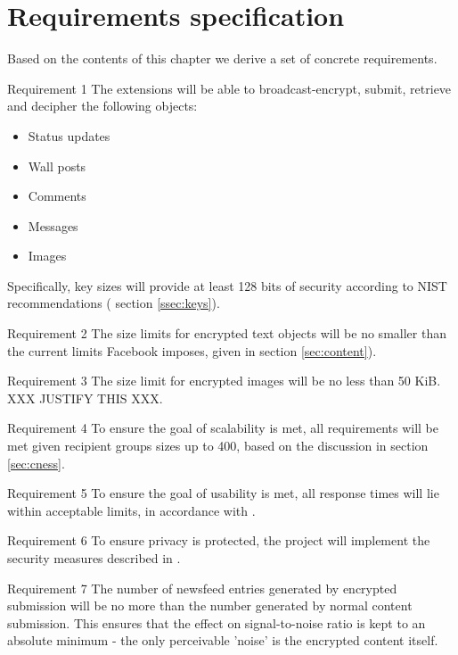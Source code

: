 \FloatBarrier
\section{Requirements specification}

Based on the contents of this chapter we derive a set of concrete requirements.
        
\begin{desc}

    \item[Requirement 1] The extensions will be able to broadcast-encrypt, submit, retrieve and decipher the following objects:
    
    \begin{itemize}
        \item Status updates
        \item Wall posts
        \item Comments
        \item Messages
        \item Images
    \end{itemize}
    
    Specifically, key sizes will provide at least 128 bits of security according to NIST recommendations ( section \ref{ssec:keys}).
    
    \item[Requirement 2] The size limits for encrypted text objects will be no smaller than the current limits Facebook imposes, given in section \ref{sec:content}).

    \item[Requirement 3] The size limit for encrypted images will be no less than 50 KiB. XXX JUSTIFY THIS XXX.

    \item[Requirement 4] To ensure the goal of scalability is met, all requirements will be met given recipient groups sizes up to 400, based on the discussion in section \ref{sec:cness}.
    
    
    \item[Requirement 5] To ensure the goal of usability is met, all response times will lie within acceptable limits, in accordance with \cite{response}.


    \item[Requirement 6] To ensure privacy is protected, the project will implement the security measures described in \label{ssec:threat}.


    \item[Requirement 7] The number of newsfeed entries generated by encrypted submission will be no more than the number generated by normal content submission. This ensures that the effect on signal-to-noise ratio is kept to an absolute minimum - the only perceivable 'noise' is the encrypted content itself.
    


\end{desc}
